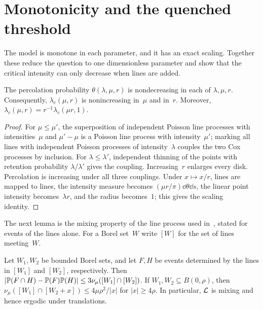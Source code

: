 \documentclass[11pt,letterpaper]{article}
\begin{document}
\section{Monotonicity and the quenched threshold}
\label{sec:quenched}

The model is monotone in each parameter, and it has an exact scaling. Together these reduce the question to one dimensionless parameter and show that the critical intensity can only decrease when lines are added.

\begin{proposition}
\label{prop:monotone}
The percolation probability $\theta(\lambda,\mu,r)$ is nondecreasing in each of $\lambda,\mu,r$. Consequently, $\lambda_c(\mu,r)$ is nonincreasing in~$\mu$ and in~$r$. Moreover, $\lambda_c(\mu,r)=r^{-1}\lambda_c(\mu r,1)$.
\end{proposition}

\begin{proof}
For $\mu\le\mu'$, the superposition of independent Poisson line processes with intensities~$\mu$ and $\mu'-\mu$ is a Poisson line process with intensity~$\mu'$; marking all lines with independent Poisson processes of intensity~$\lambda$ couples the two Cox processes by inclusion. For $\lambda\le\lambda'$, independent thinning of the points with retention probability $\lambda/\lambda'$ gives the coupling. Increasing~$r$ enlarges every disk. Percolation is increasing under all three couplings. Under $x\mapsto x/r$, lines are mapped to lines, the intensity measure becomes $(\mu r/\pi)\dd\theta\dd s$, the linear point intensity becomes~$\lambda r$, and the radius becomes~$1$; this gives the scaling identity.
\end{proof}

The next lemma is the mixing property of the line process used in~\cite[Lemma~3.4]{HJ26}, stated for events of the lines alone. For a Borel set~$W$ write $[W]$ for the set of lines meeting~$W$.

\begin{lemma}
\label{lem:mixing}
Let $W_1,W_2$ be bounded Borel sets, and let $F,H$ be events determined by the lines in $[W_1]$ and $[W_2]$, respectively. Then $\lvert\P(F\cap H)-\P(F)\P(H)\rvert\le3\nu_\mu([W_1]\cap[W_2])$. If $W_1,W_2\subseteq B(0,\rho)$, then $\nu_\mu([W_1]\cap[W_2+x])\le4\mu\rho^2/\lvert x\rvert$ for $\lvert x\rvert\ge4\rho$. In particular, $\cL$ is mixing and hence ergodic under translations.
\end{lemma}
\end{document}
